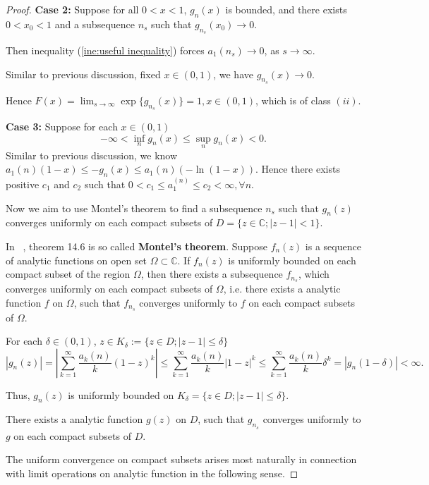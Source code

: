 \documentclass[12pt]{article}
\theoremstyle{plain}
\theoremstyle{definition}
\theoremstyle{remark}
\begin{document}
\begin{proof}
    \textbf{Case 2:} Suppose for all $0<x<1$, $g_n(x)$ is bounded, and there exists $0<x_0<1$ and a subsequence $n_s$ such that $g_{n_s}(x_0)\rightarrow0$.
    
    Then inequality (\ref{ine:useful inequality}) forces $a_1{(n_s)}\rightarrow 0$, as $s\rightarrow \infty$.
    
    Similar to previous discussion, fixed $x\in(0,1)$, we have $g_{n_s}(x)\rightarrow 0$.
    
    Hence $F(x)=\lim_{s\rightarrow\infty}\exp\{g_{n_s}(x)\}=1,x\in (0,1)$, which is of class $(ii)$.
    
    \textbf{Case 3:} Suppose for each $x\in (0,1)$ 
    $$
    -\infty<\inf_{n} g_{n}(x)\leq \sup_{n} g_{n}(x)<0.
    $$
    Similar to previous discussion, we know 
    $a_1{(n)}(1-x)\leq-g_{n}(x)\leq a_1{(n)}(-\ln(1-x))$.
    Hence there exists positive $c_1$ and $c_2$ such that $0<c_1\leq a_1^{(n)}\leq c_2<\infty,\forall n$.
    
    Now we aim to use Montel's theorem to find a subsequence $n_s$ such that $g_n(z)$ converges uniformly on each compact subsets of $D=\{z\in\mathbb{C};|z-1|<1\}$.
    
In ~\cite{RudinComplex}, theorem 14.6 is so called
\textbf{Montel's theorem}.
Suppose $f_n(z)$ is a sequence of analytic functions on open set $\Omega\subset\mathbb{C}$. If $f_n(z)$ is uniformly bounded on each compact subset of the region $\Omega$, then there exists a subsequence $f_{n_s}$, which converges uniformly on each compact subsets of $\Omega$, i.e. there exists a analytic function $f$ on $\Omega$, such that $f_{n_s}$ converges uniformly to $f$ on each compact subsets of $\Omega$.

For each $\delta\in(0,1)$, $z\in K_\delta:=\{z\in D;|z-1|\leq\delta\}$ \begin{equation*}
    |g_n(z)|=| \sum_{k=1}^\infty \frac{a_k{(n)}}{k}(1-z)^k|\leq \sum_{k=1}^\infty \frac{a_k{(n)}}{k}|1-z|^k\leq \sum_{k=1}^\infty \frac{a_k{(n)}}{k}\delta^k=|g_n(1-\delta)|<\infty.
\end{equation*}

Thus, $g_n(z)$ is uniformly bounded on $K_\delta=\{z\in D;|z-1|\leq\delta\}$.

There exists a analytic function $g(z)$ on $D$, such that $g_{n_s}$ converges uniformly to $g$ on each compact subsets of $D$. 

The uniform convergence on compact subsets arises most naturally in connection with limit operations on analytic function in the following sense.


\end{proof}
\end{document}
